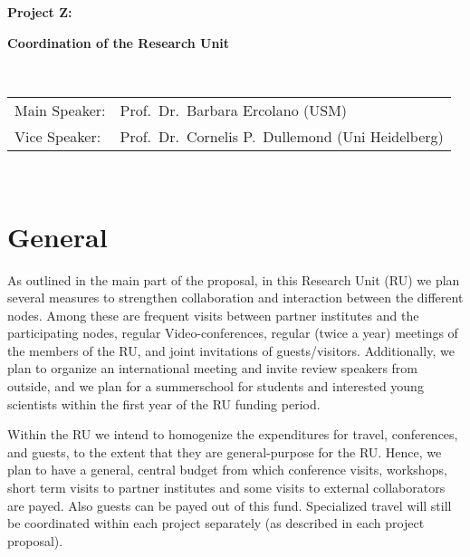 \documentclass[10pt,fleqn,twoside]{article}
\begin{document}
\newpage


\setcounter{page}{1}

\centerline{\huge\bf\Tcol
%
%
%
%
%
 Project Z:}
\vspace{1em}

\centerline{\LARGE\bf\Tcol Coordination of the Research Unit}

%
%
%
%
%
\vskip1.0cm


\\
\begin{tabular}{ll}
{\textsf{Main Speaker:}}   & Prof.\ Dr.\ Barbara Ercolano (USM)\\
{\textsf{Vice Speaker:}}   & Prof.\ Dr.\ Cornelis P.~Dullemond (Uni Heidelberg)
\end{tabular}


\vspace{1em}
 \\


\section{General}
%
As outlined in the main part of the proposal, in this Research Unit (RU) we
plan several measures to strengthen collaboration and interaction between
the different nodes.  Among these are frequent visits between partner
institutes and the participating nodes, regular Video-conferences, regular
(twice a year) meetings of the members of the RU, and joint invitations of
guests/visitors. Additionally, we plan to organize an international meeting
and invite review speakers from outside, and we plan for a summerschool for
students and interested young scientists within the first year of the RU
funding period.

Within the RU we intend to homogenize the expenditures for travel,
conferences, and guests, to the extent that they are general-purpose for the
RU. Hence, we plan to have a general, central budget from which conference
visits, workshops, short term visits to partner institutes and some visits
to external collaborators are payed. Also guests can be payed out of this
fund. Specialized travel will still be coordinated within each project
separately (as described in each project proposal).
\end{document}
